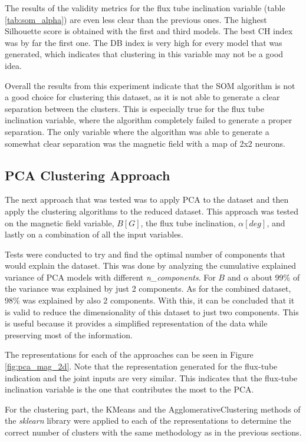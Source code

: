 The results of the validity metrics for the flux tube inclination variable (table \ref{tab:som_alpha}) are even less clear than the previous ones. The highest Silhouette score is obtained with the first and third models. The best CH index was by far the first one. The DB index is very high for every model that was generated, which indicates that clustering in this variable may not be a good idea.

Overall the results from this experiment indicate that the SOM algorithm is not a good choice for clustering this dataset, as it is not able to generate a clear separation between the clusters. This is especially true for the flux tube inclination variable, where the algorithm completely failed to generate a proper separation. The only variable where the algorithm was able to generate a somewhat clear separation was the magnetic field with a map of 2x2 neurons.


\subsection{PCA Clustering Approach}\label{sec:pca_clustering}
The next approach that was tested was to apply PCA to the dataset and then apply the clustering algorithms to the reduced dataset. This approach was tested on the magnetic field variable, $B[G]$, the flux tube inclination, $\alpha [deg]$, and lastly on a combination of all the input variables. 

Tests were conducted to try and find the optimal number of components that would explain the dataset. This was done by analyzing the cumulative explained variance of PCA models with different \textit{n\_components}. For $B$ and $\alpha$ about 99\% of the variance was explained by just 2 components. As for the combined dataset, 98\% was explained by also 2 components. With this, it can be concluded that it is valid to reduce the dimensionality of this dataset to just two components. This is useful because it provides a simplified representation of the data while preserving most of the information. 

The representations for each of the approaches can be seen in Figure \ref{fig:pca_mag_2d}. Note that the representation generated for the flux-tube indication and the joint inputs are very similar. This indicates that the flux-tube inclination variable is the one that contributes the most to the PCA.

For the clustering part, the KMeans and the AgglomerativeClustering methods of the \textit{sklearn} library were applied to each of the representations to determine the correct number of clusters with the same methodology as in the previous sections. 

